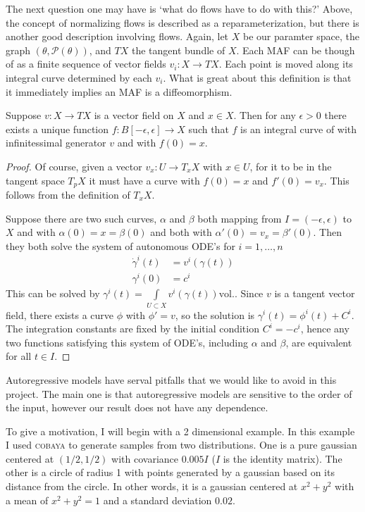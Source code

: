 The next question one may have is `what do flows have to do with this?' Above, the concept of normalizing flows is described as a reparameterization, but there is another good description involving flows. Again, let $X$ be our paramter space, the graph $(\theta,\mathcal{P}(\theta))$, and $TX$ the tangent bundle of $X$. Each MAF can be though of as a finite sequence of vector fields $v_i:X \rightarrow TX$. Each point is moved along its integral curve determined by each $v_i$. What is great about this definition is that it immediately implies an MAF is a diffeomorphism. 
\begin{prop}
Suppose $v:X \rightarrow TX$ is a vector field on $X$ and $x \in X$. Then for any $\epsilon>0$ there exists a unique function $f:B[-\epsilon,\epsilon]\rightarrow X$ such that $f$ is an integral curve of with infinitessimal generator $v$ and with $f(0) = x$.  
\end{prop}
\begin{proof}
Of course, given a vector $v_x:U\rightarrow T_x X$ with $x\in U$, for it to be in the tangent space $T_pX$ it must have a curve with $f(0)=x$ and $f'(0)=v_x$. This follows from the definition of $T_xX$.

Suppose there are two such curves, $\alpha$ and $\beta$ both mapping from $I=(-\epsilon,\epsilon)$ to $X$ and with $\alpha(0) = x = \beta(0)$ and both with $\alpha'(0) = v_x = \beta'(0)$. Then they both solve the system of autonomous ODE's for $i=1,\dots,n$
\begin{equation}
\begin{split}
	\dot{\gamma}^i(t) &= v^i(\gamma(t)) \\
	\gamma^i(0) &= c^i
\end{split}
\end{equation}
This can be solved by $\gamma^i(t) = \int\limits_{U\subset X}v^i(\gamma(t))\text{vol.}$. Since $v$ is a tangent vector field, there exists a curve $\phi$ with $\phi' = v$, so the solution is $\gamma^i(t) = \phi^i(t)+C^i$. The integration constants are fixed by the initial condition $C^i=-c^i$, hence any two functions satisfying this system of ODE's, including $\alpha$ and $\beta$, are equivalent for all $t\in I$.
\end{proof}

Autoregressive models have serval pitfalls that we would like to avoid in this project. The main one is that autoregressive models are sensitive to the order of the input, however our result does not have any dependence. 

To give a motivation, I will begin with a 2 dimensional example. 
In this example I used \textsc{cobaya} to generate samples from two distributions. 
One is a pure gaussian centered at $(1/2,1/2)$ with covariance $0.005 I$  ($I$ is the identity matrix). 
The other is a circle of radius 1 with points generated by a gaussian based on its distance from the circle. 
In other words, it is a gaussian centered at $x^2+y^2$ with a mean of $x^2+y^2=1$ and a standard deviation $0.02$.


